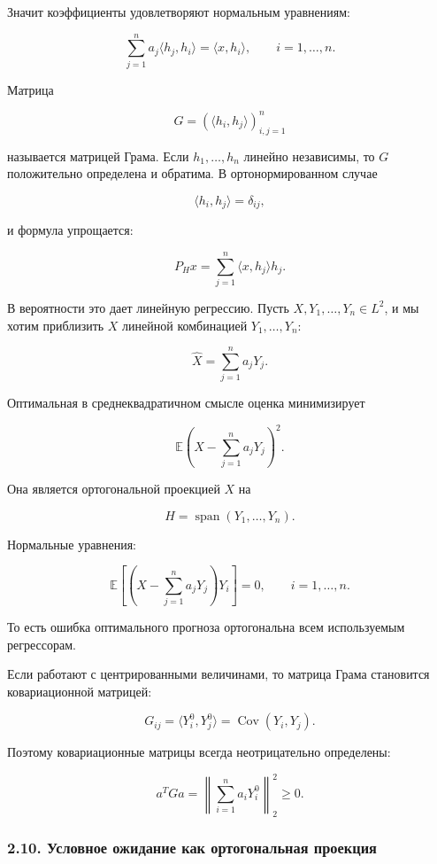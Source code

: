 \documentclass[
  11pt,
  a4paper,
]{article}
\begin{document}
Значит коэффициенты удовлетворяют нормальным уравнениям:

\[
\sum_{j=1}^n a_j\langle h_j,h_i\rangle
=
\langle x,h_i\rangle,
\qquad i=1,\ldots,n.
\]

Матрица

\[
G=(\langle h_i,h_j\rangle)_{i,j=1}^n
\]

называется матрицей Грама. Если \(h_1,\ldots,h_n\) линейно независимы,
то \(G\) положительно определена и обратима. В ортонормированном случае

\[
\langle h_i,h_j\rangle=\delta_{ij},
\]

и формула упрощается:

\[
P_Hx=\sum_{j=1}^n \langle x,h_j\rangle h_j.
\]

В вероятности это дает линейную регрессию. Пусть
\(X,Y_1,\ldots,Y_n\in L^2\), и мы хотим приблизить \(X\) линейной
комбинацией \(Y_1,\ldots,Y_n\):

\[
\widehat X=\sum_{j=1}^n a_jY_j.
\]

Оптимальная в среднеквадратичном смысле оценка минимизирует

\[
\mathbb E\left(X-\sum_{j=1}^n a_jY_j\right)^2.
\]

Она является ортогональной проекцией \(X\) на

\[
H=\operatorname{span}(Y_1,\ldots,Y_n).
\]

Нормальные уравнения:

\[
\mathbb E\left[\left(X-\sum_{j=1}^n a_jY_j\right)Y_i\right]=0,
\qquad i=1,\ldots,n.
\]

То есть ошибка оптимального прогноза ортогональна всем используемым
регрессорам.

Если работают с центрированными величинами, то матрица Грама становится
ковариационной матрицей:

\[
G_{ij}
=
\langle Y_i^0,Y_j^0\rangle
=
\operatorname{Cov}(Y_i,Y_j).
\]

Поэтому ковариационные матрицы всегда неотрицательно определены:

\[
a^TGa
=
\left\|\sum_{i=1}^n a_iY_i^0\right\|_2^2
\ge0.
\]

\subsubsection{2.10. Условное ожидание как ортогональная
проекция}\label{ux443ux441ux43bux43eux432ux43dux43eux435-ux43eux436ux438ux434ux430ux43dux438ux435-ux43aux430ux43a-ux43eux440ux442ux43eux433ux43eux43dux430ux43bux44cux43dux430ux44f-ux43fux440ux43eux435ux43aux446ux438ux44f}
\end{document}
